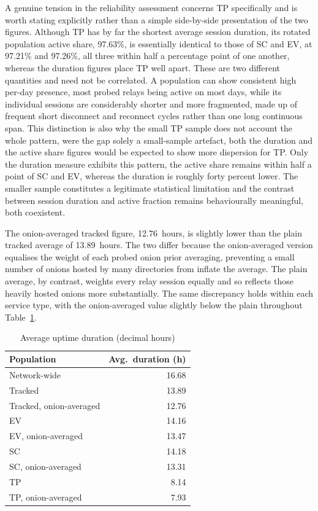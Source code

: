 \documentclass[conference]{IEEEtran}
\begin{document}
A genuine tension in the reliability assessment concerns TP specifically and is worth stating explicitly rather than a simple side-by-side presentation of 
the two figures. Although TP has by far the shortest average session duration, its rotated population active share, 97.63\%, is essentially identical to those 
of SC and EV, at 97.21\% and 97.26\%, all three within half a percentage point of one another, whereas the duration figures place TP well apart. These 
are two different quantities and need not be correlated. A population can show consistent high per-day presence, most probed relays being active 
on most days, while its individual sessions are considerably shorter and more fragmented, made up of frequent short disconnect and reconnect cycles 
rather than one long continuous span. This distinction is also why the small TP sample does not account the whole pattern, were the gap solely a 
small-sample artefact, both the duration and the active share figures would be expected to show more dispersion for TP. Only the duration measure exhibits
this pattern, the active share remains within half a point of SC and EV, whereas the duration is roughly forty percent lower. The smaller sample constitutes a 
legitimate statistical limitation and the contrast between session duration and active fraction remains behaviourally meaningful, both coexistent.
 
The onion-averaged tracked figure, 12.76~hours, is slightly lower than the plain tracked average of 13.89~hours. The two differ because the 
onion-averaged version equalises the weight of each probed onion prior averaging, preventing a small number of onions hosted by many directories from 
inflate the average. The plain average, by contrast, weights every relay session equally and so reflects those heavily hosted onions 
more substantially. The same discrepancy holds within each service type, with the onion-averaged value slightly below the plain throughout Table~\ref{tab:uptime_durations}.
 
\begin{table}[htbp]
\caption{Average uptime duration (decimal hours)}
\begin{center}
\begin{tabular}{|l|r|}
\hline
\textbf{Population} & \textbf{Avg.\ duration (h)} \\
\hline
Network-wide & 16.68 \\
\hline
Tracked & 13.89 \\
\hline
Tracked, onion-averaged & 12.76 \\
\hline
EV & 14.16 \\
\hline
EV, onion-averaged & 13.47 \\
\hline
SC & 14.18 \\
\hline
SC, onion-averaged & 13.31 \\
\hline
TP & 8.14 \\
\hline
TP, onion-averaged & 7.93 \\
\hline
\end{tabular}
\label{tab:uptime_durations}
\end{center}
\end{table}
 
\end{document}
